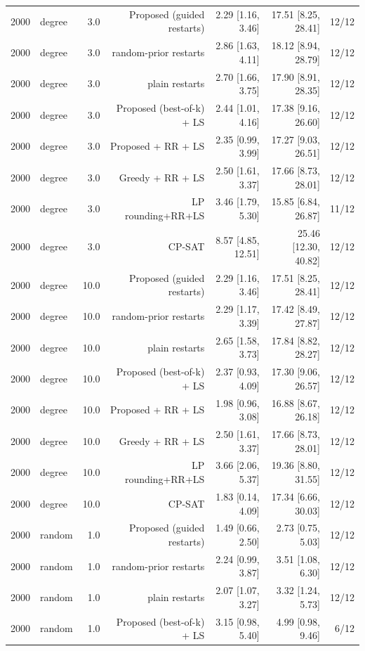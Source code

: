 \begin{table}[t]
\begin{tabular}{llrrrrr}
2000 & degree & 3.0 & Proposed (guided restarts) & 2.29 [1.16, 3.46] & 17.51 [8.25, 28.41] & 12/12 \\
2000 & degree & 3.0 & random-prior restarts & 2.86 [1.63, 4.11] & 18.12 [8.94, 28.79] & 12/12 \\
2000 & degree & 3.0 & plain restarts & 2.70 [1.66, 3.75] & 17.90 [8.91, 28.35] & 12/12 \\
2000 & degree & 3.0 & Proposed (best-of-k) + LS & 2.44 [1.01, 4.16] & 17.38 [9.16, 26.60] & 12/12 \\
2000 & degree & 3.0 & Proposed + RR + LS & 2.35 [0.99, 3.99] & 17.27 [9.03, 26.51] & 12/12 \\
2000 & degree & 3.0 & Greedy + RR + LS & 2.50 [1.61, 3.37] & 17.66 [8.73, 28.01] & 12/12 \\
2000 & degree & 3.0 & LP rounding+RR+LS & 3.46 [1.79, 5.30] & 15.85 [6.84, 26.87] & 11/12 \\
2000 & degree & 3.0 & CP-SAT & 8.57 [4.85, 12.51] & 25.46 [12.30, 40.82] & 12/12 \\
2000 & degree & 10.0 & Proposed (guided restarts) & 2.29 [1.16, 3.46] & 17.51 [8.25, 28.41] & 12/12 \\
2000 & degree & 10.0 & random-prior restarts & 2.29 [1.17, 3.39] & 17.42 [8.49, 27.87] & 12/12 \\
2000 & degree & 10.0 & plain restarts & 2.65 [1.58, 3.73] & 17.84 [8.82, 28.27] & 12/12 \\
2000 & degree & 10.0 & Proposed (best-of-k) + LS & 2.37 [0.93, 4.09] & 17.30 [9.06, 26.57] & 12/12 \\
2000 & degree & 10.0 & Proposed + RR + LS & 1.98 [0.96, 3.08] & 16.88 [8.67, 26.18] & 12/12 \\
2000 & degree & 10.0 & Greedy + RR + LS & 2.50 [1.61, 3.37] & 17.66 [8.73, 28.01] & 12/12 \\
2000 & degree & 10.0 & LP rounding+RR+LS & 3.66 [2.06, 5.37] & 19.36 [8.80, 31.55] & 12/12 \\
2000 & degree & 10.0 & CP-SAT & 1.83 [0.14, 4.09] & 17.34 [6.66, 30.03] & 12/12 \\
2000 & random & 1.0 & Proposed (guided restarts) & 1.49 [0.66, 2.50] & 2.73 [0.75, 5.03] & 12/12 \\
2000 & random & 1.0 & random-prior restarts & 2.24 [0.99, 3.87] & 3.51 [1.08, 6.30] & 12/12 \\
2000 & random & 1.0 & plain restarts & 2.07 [1.07, 3.27] & 3.32 [1.24, 5.73] & 12/12 \\
2000 & random & 1.0 & Proposed (best-of-k) + LS & 3.15 [0.98, 5.40] & 4.99 [0.98, 9.46] & 6/12 \\

\end{tabular}
\end{table}

